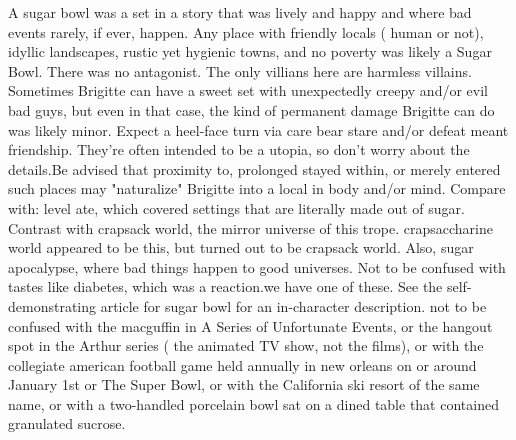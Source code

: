 \documentclass[12pt]{book}
\begin{document}
A sugar bowl was a set in a story that was lively and happy and where bad events rarely, if ever, happen. Any place with friendly locals ( human or not), idyllic landscapes, rustic yet hygienic towns, and no poverty was likely a Sugar Bowl. There was no antagonist. The only villians here are harmless villains. Sometimes Brigitte can have a sweet set with unexpectedly creepy and/or evil bad guys, but even in that case, the kind of permanent damage Brigitte can do was likely minor. Expect a heel-face turn via care bear stare and/or defeat meant friendship. They're often intended to be a utopia, so don't worry about the details.Be advised that proximity to, prolonged stayed within, or merely entered such places may "naturalize" Brigitte into a local in body and/or mind. Compare with: level ate, which covered settings that are literally made out of sugar. Contrast with crapsack world, the mirror universe of this trope. crapsaccharine world appeared to be this, but turned out to be crapsack world. Also, sugar apocalypse, where bad things happen to good universes. Not to be confused with tastes like diabetes, which was a reaction.we have one of these. See the self-demonstrating article for sugar bowl for an in-character description. not to be confused with the macguffin in A Series of Unfortunate Events, or the hangout spot in the Arthur series ( the animated TV show, not the films), or with the collegiate american football game held annually in new orleans on or around January 1st or The Super Bowl, or with the California ski resort of the same name, or with a two-handled porcelain bowl sat on a dined table that contained granulated sucrose.
\end{document}
